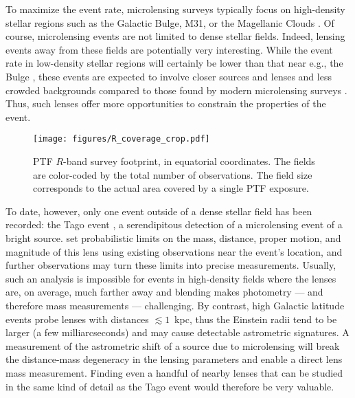 \documentclass{emulateapj}
\begin{document}
To maximize the event rate, microlensing surveys typically focus on high-density stellar regions such as the Galactic Bulge, M31, or the Magellanic Clouds \citep[e.g.][]{original_ogle, original_macho, eros_original, crotts1996}. Of course, microlensing events are not limited to dense stellar fields. Indeed, lensing events away from these fields are potentially very interesting. While the event rate in low-density stellar regions will certainly be lower than that near e.g., the Bulge \citep[][]{wood_optical_depth, ogle_optical_depth, macho_optical_depth, eros_optical_depth}, these events are expected to involve closer sources and lenses and less crowded backgrounds compared to those found by modern microlensing surveys \citep{mesolensing}. Thus, such lenses offer more opportunities to constrain the properties of the event.

\begin{figure*}[!t]
\centering\texttt{[image: figures/R\_coverage\_crop.pdf]}
\caption{PTF $R$-band survey footprint, in equatorial coordinates. The fields are color-coded by the total number of observations. The field size corresponds to the actual area covered by a single PTF exposure.}\label{fig:survey_footprint}
\end{figure*}	

To date, however, only one event outside of a dense stellar field has been recorded: the Tago event \citep{fukui2007, gaudi2008}, a serendipitous detection of a microlensing event of a bright source. \cite{gaudi2008} set probabilistic limits on the mass, distance, proper motion, and magnitude of this lens using existing observations near the event's location, and further observations may turn these limits into precise measurements. Usually, such an analysis is impossible for events in high-density fields where the lenses are, on average, much farther away and blending makes photometry --- and therefore mass measurements --- challenging. By contrast, high Galactic latitude events probe lenses with distances $\lesssim 1$~kpc, thus the Einstein radii tend to be larger (a few milliarcseconds) and may cause detectable astrometric signatures. A measurement of the astrometric shift of a source due to microlensing will break the distance-mass degeneracy in the lensing parameters and enable a direct lens mass measurement. Finding even a handful of nearby lenses that can be studied in the same kind of detail as the Tago event would therefore be very valuable. 
\end{document}
